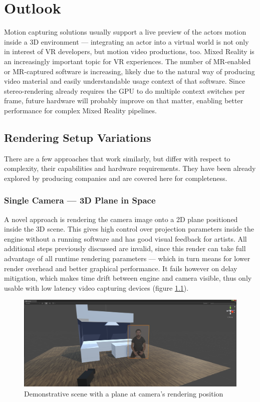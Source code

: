 %
\chapter{Outlook}

Motion capturing solutions usually support a live preview of the actors motion 
inside a 3D environment --- integrating an actor into a virtual world is not 
only in interest of VR developers, but motion video productions, too. Mixed 
Reality is an increasingly important topic for VR experiences. The number of 
MR-enabled or MR-captured software is increasing, likely due to the natural way 
of producing video material and easily understandable usage context of that 
software. Since stereo-rendering already requires the GPU to do multiple 
context switches per frame, future hardware will probably improve on that 
matter, enabling better performance for complex Mixed Reality pipelines.

\section{Rendering Setup Variations}

There are a few approaches that work similarly, but differ with respect to 
complexity, their capabilities and hardware requirements. They have been 
already explored by producing companies and are covered here for completeness.

\subsection{Single Camera --- 3D Plane in Space}

A novel approach is rendering the camera image onto a 2D plane positioned 
inside the 3D scene. This gives high control over projection parameters inside 
the engine without a running software and has good visual feedback for artists. 
All additional steps previously discussed are invalid, since this render can 
take full advantage of all runtime rendering parameters --- which in turn means 
for lower render overhead and better graphical performance. It fails however on 
delay mitigation, which makes time drift between engine and camera visible, 
thus only usable with low latency video capturing devices (figure 
\ref{fig:alt-render:single-camera}).

\begin{figure}[htb]
	\includegraphics[width=\textwidth]{gfx/eval/plane-scene.png}
	\caption{Demonstrative scene with a plane at camera's rendering position}
	\label{fig:alt-render:single-camera}
\end{figure}

